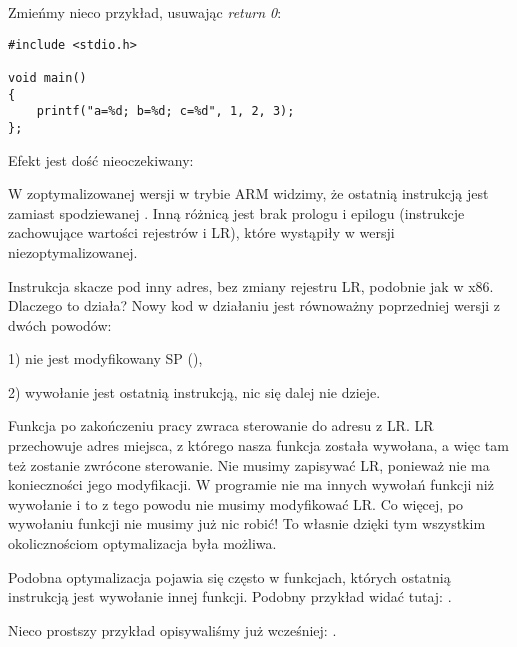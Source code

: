 \label{ARM_B_to_printf}

Zmieńmy nieco przykład, usuwając \emph{return 0}:

\begin{lstlisting}[style=customc]
#include <stdio.h>

void main()
{
	printf("a=%d; b=%d; c=%d", 1, 2, 3);
};
\end{lstlisting}

Efekt jest dość nieoczekiwany:



W zoptymalizowanej wersji w trybie ARM widzimy, że ostatnią instrukcją jest  zamiast spodziewanej .
Inną różnicą jest brak prologu i epilogu (instrukcje zachowujące wartości rejestrów  i \ac{LR}), które wystąpiły w wersji niezoptymalizowanej.

Instrukcja  skacze pod inny adres, bez zmiany rejestru \ac{LR}, podobnie jak \JMP w x86.
Dlaczego to działa?
Nowy kod w działaniu jest równoważny poprzedniej wersji z dwóch powodów:

1) nie jest modyfikowany \ac{SP} (),

2) wywołanie \printf jest ostatnią instrukcją, nic się dalej nie dzieje.

Funkcja \printf po zakończeniu pracy zwraca sterowanie do adresu z \ac{LR}.
\ac{LR} przechowuje adres miejsca, z którego nasza funkcja została wywołana, a więc tam też zostanie zwrócone sterowanie.
Nie musimy zapisywać \ac{LR}, ponieważ nie ma konieczności jego modyfikacji.
W programie nie ma innych wywołań funkcji niż wywołanie \printf i to z tego powodu nie musimy modyfikować \ac{LR}. Co więcej, po wywołaniu funkcji nie musimy już nic robić!
To własnie dzięki tym wszystkim okolicznościom optymalizacja była możliwa.

Podobna optymalizacja pojawia się często w funkcjach, których ostatnią instrukcją jest wywołanie innej funkcji.
Podobny przykład widać tutaj:
.

Nieco prostszy przykład opisywaliśmy już wcześniej: .



